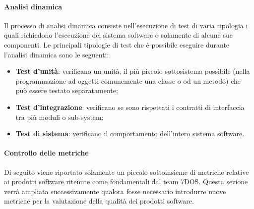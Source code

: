 \paragraph{Analisi dinamica}\Spazio
Il processo di analisi dinamica consiste nell'esecuzione di test di varia tipologia i quali richiedono l'esecuzione del sistema software o solamente di alcune sue componenti.
Le principali tipologie di test che è possibile eseguire durante l'analisi dinamica sono le seguenti:
\begin{itemize}
	\item {\textbf{Test d'unità}: verificano un unità, il più piccolo sottosistema possibile (nella programmazione ad oggetti comunemente una classe o od un metodo) che può essere testato separatamente;}
	\item {\textbf{Test d'integrazione}: verificano se sono rispettati i contratti di interfaccia tra più moduli o sub-system;}
	\item {\textbf{Test di sistema}: verificano il comportamento dell’intero sistema software.}
\end{itemize}

\paragraph{Controllo delle metriche} \Spazio
Di seguito viene riportato solamente un piccolo sottoinsieme di metriche relative ai prodotti software ritenute come fondamentali dal team 7DOS.
Questa sezione verrà ampliata successivamente qualora fosse necessario introdurre nuove metriche per la valutazione della qualità dei prodotti software.

